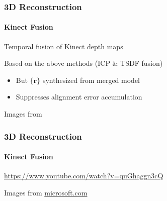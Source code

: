 \documentclass[xetex,professionalfont]{beamer}
\renewcommand{\vec}[1]{\ensuremath{\mathbf{#1}}}
\newcommand{\vr}{\vec{r}}
\begin{document}

\begin{frame}
\frametitle{3D Reconstruction}
\framesubtitle{Kinect Fusion}

Temporal fusion of Kinect depth maps

\bigskip
Based on the above methods (ICP \& TSDF fusion)
\begin{itemize}
	\item But $\{\vr\}$ synthesized from merged model
	\item Suppresses alignment error accumulation
\end{itemize}

\begin{center}
    {\centering Images from \cite{newcombe2011}}
\end{center}

\end{frame}


\begin{frame}
\frametitle{3D Reconstruction}
\framesubtitle{Kinect Fusion}

\begin{center}
	\url{https://www.youtube.com/watch?v=quGhaggn3cQ}
\end{center}

\begin{center}
    {\centering Images from \url{microsoft.com}}
\end{center}

\end{frame}

\end{document}
